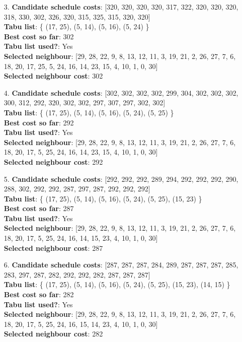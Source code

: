 \documentclass[fleqn]{article}
\begin{document}
\begin{itemize}
    \item[3.] \textbf{Candidate schedule costs}: [320, 320, 320, 320, 317, 322, 320, 320, 320, 318, 330, 302, 326, 320, 315, 325, 315, 320, 320] \\
    \textbf{Tabu list}: \{ (17, 25), (5, 14), (5, 16), (5, 24) \} \\
    \textbf{Best cost so far}: 302 \\
    \textbf{Tabu list used?}: Yes \\
    \textbf{Selected neighbour}: [29, 28, 22, 9, 8, 13, 12, 11, 3, 19, 21, 2, 26, 27, 7, 6, 18, 20, 17, 25, 5, 24, 16, 14, 23, 15, 4, 10, 1, 0, 30] \\
    \textbf{Selected neighbour cost}: 302
      

    \item[4.] \textbf{Candidate schedule costs}: [302, 302, 302, 302, 299, 304, 302, 302, 302, 300, 312, 292, 320, 302, 302, 297, 307, 297, 302, 302] \\
    \textbf{Tabu list}: \{ (17, 25), (5, 14), (5, 16), (5, 24), (5, 25) \} \\
    \textbf{Best cost so far}: 292 \\
    \textbf{Tabu list used?}: Yes \\
    \textbf{Selected neighbour}: [29, 28, 22, 9, 8, 13, 12, 11, 3, 19, 21, 2, 26, 27, 7, 6, 18, 20, 17, 5, 25, 24, 16, 14, 23, 15, 4, 10, 1, 0, 30] \\
    \textbf{Selected neighbour cost}: 292
      

    \item[5.] \textbf{Candidate schedule costs}: [292, 292, 292, 289, 294, 292, 292, 292, 290, 288, 302, 292, 292, 287, 297, 287, 292, 292, 292] \\
    \textbf{Tabu list}: \{ (17, 25), (5, 14), (5, 16), (5, 24), (5, 25), (15, 23) \} \\
    \textbf{Best cost so far}: 287 \\
    \textbf{Tabu list used?}: Yes \\
    \textbf{Selected neighbour}: [29, 28, 22, 9, 8, 13, 12, 11, 3, 19, 21, 2, 26, 27, 7, 6, 18, 20, 17, 5, 25, 24, 16, 14, 15, 23, 4, 10, 1, 0, 30] \\
    \textbf{Selected neighbour cost}: 287
      

    \item[6.] \textbf{Candidate schedule costs}: [287, 287, 287, 284, 289, 287, 287, 287, 285, 283, 297, 287, 282, 292, 292, 282, 287, 287, 287] \\
    \textbf{Tabu list}: \{ (17, 25), (5, 14), (5, 16), (5, 24), (5, 25), (15, 23), (14, 15) \} \\
    \textbf{Best cost so far}: 282 \\
    \textbf{Tabu list used?}: Yes \\
    \textbf{Selected neighbour}: [29, 28, 22, 9, 8, 13, 12, 11, 3, 19, 21, 2, 26, 27, 7, 6, 18, 20, 17, 5, 25, 24, 16, 15, 14, 23, 4, 10, 1, 0, 30] \\
    \textbf{Selected neighbour cost}: 282
      


\end{itemize}
\end{document}
